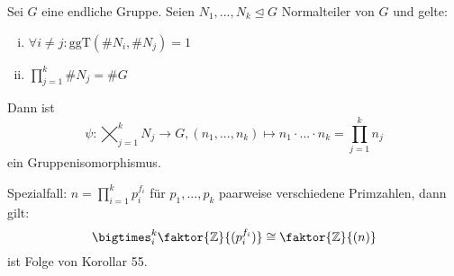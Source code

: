 \documentclass[a4paper]{report}
\begin{document}
\begin{kor}[Übung]
  Sei $G$ eine endliche Gruppe. Seien $N_{1}, ..., N_{k} \trianglelefteq G$ Normalteiler von $G$ und gelte:
  \begin{enumerate}[(i)]
    \item $\forall i \ne j : \mathrm{ggT}(\#N_{i}, \#N_{j}) = 1$
    \item $\prod_{j=1}^k \# N_{j} = \#G$
  \end{enumerate}
  Dann ist $$\psi : \bigtimes_{j=1}^{k}N_{j} \longrightarrow G, (n_{1}, ..., n_{k}) \longmapsto n_{1}\cdot ... \cdot n_{k} = \prod_{j=1}^{k}n_{j}$$
  ein Gruppenisomorphismus.
\item
\end{kor}
\begin{ubng*}
Spezialfall: $n = \prod_{i=1}^{k}p_{i}^{f_{i}}$ für $p_{1}, ..., p_{k}$ paarweise verschiedene Primzahlen, dann gilt:
$$\bigtimes_{i}^{k}\faktor{\Bbb Z}{(p_{i}^{f_{i}})} \cong \faktor{\Bbb Z}{(n)}$$
ist Folge von Korollar 55.
\end{ubng*}
\end{document}
